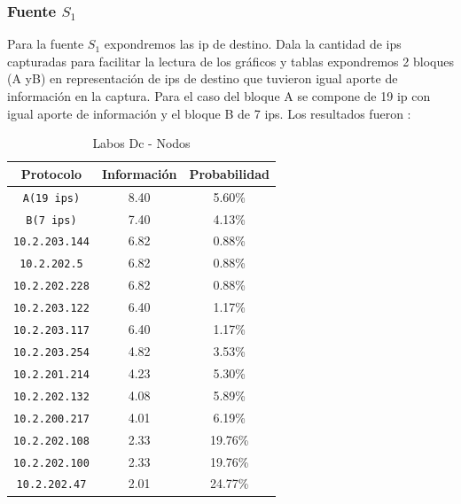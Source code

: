 \documentclass[final,inline,narroweqnarray,a4paper]{ieee}
\begin{document}
\subsubsection{Fuente $S_1$}

Para la fuente $S_1$ expondremos las ip de destino. Dala la cantidad de ips capturadas para facilitar la lectura de los gráficos y tablas expondremos 2 bloques (A yB) en representación de ips de destino que tuvieron igual aporte de información en la captura. Para el caso del bloque A se compone de 19 ip con igual aporte de información y el bloque B de 7 ips. Los resultados fueron :

\begin{table}[H]
    \begin{center}
        \begin{tabular}{|c|c|c|}
            \hline
            \textbf{Protocolo} & \textbf{Información} & \textbf{Probabilidad} \\ \hline
            \texttt{A(19 ips)}    &8.40        & 5.60\%     \\ \hline
            \texttt{B(7 ips)}     &7.40        & 4.13\%     \\ \hline
            \texttt{10.2.203.144} &6.82        & 0.88\%     \\ \hline
            \texttt{10.2.202.5}   &6.82        & 0.88\%     \\ \hline
            \texttt{10.2.202.228} &6.82        & 0.88\%     \\ \hline
            \texttt{10.2.203.122} &6.40        & 1.17\%     \\ \hline
            \texttt{10.2.203.117} &6.40        & 1.17\%     \\ \hline
            \texttt{10.2.203.254} &4.82        & 3.53\%     \\ \hline
            \texttt{10.2.201.214} &4.23        & 5.30\%     \\ \hline
            \texttt{10.2.202.132} &4.08        & 5.89\%     \\ \hline
            \texttt{10.2.200.217} &4.01        & 6.19\%     \\ \hline
            \texttt{10.2.202.108} &2.33        & 19.76\%     \\ \hline
            \texttt{10.2.202.100} &2.33        & 19.76\%     \\ \hline
            \texttt{10.2.202.47}  &2.01        & 24.77\%     \\ \hline   
        \end{tabular}
        \caption{Labos Dc - Nodos}
        \label{table:laboDcS1}
    \end{center}
\end{table}
\end{document}
